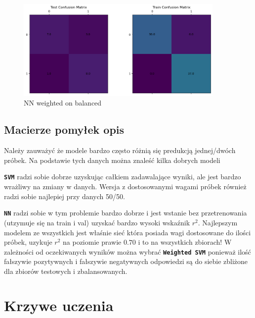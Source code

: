 \documentclass[12pt]{article}
\def\code#1{\texttt{#1}}
\begin{document}

        \begin{figure}[h!]
            \centering
            \includegraphics[width=0.9\textwidth]{resources/conf_nn_weighted_balanced.png}
            \caption{NN weighted on balanced}
            \label{fig:conf_nn_weighted_on_balanced}
        \end{figure}
        
        \newpage
        \subsection{Macierze pomyłek opis}
        Należy zauważyć że modele bardzo często różnią się predukcją jednej/dwóch próbek. Na podstawie tych 
        danych można znaleść kilka dobrych modeli
        
        \textbf{\code{SVM}} radzi sobie dobrze uzyskując całkiem zadawalające wyniki, 
        ale jest bardzo wrażliwy na zmiany w danych. Wersja z dostosowanymi wagami próbek również radzi sobie 
        najlepiej przy danych 50/50.

        \textbf{\code{NN}} radzi sobie w tym problemie bardzo dobrze i jest wstanie bez przetrenowania 
        (utzymuje się na train i val) uzyskać bardzo wysoki wskaźnik $r^2$. Najlepszym modelem ze wszystkich 
        jest właśnie sieć która posiada wagi dostosowane do ilości próbek, uzykuje $r^2$ na poziomie prawie $0.70$ i to na 
        wszystkich zbiorach! W zależności od oczekiwanych wyników można wybrać \textbf{\code{Weighted SVM}} ponieważ ilość 
        fałszywie pozytywnych i fałszywie negatywnych odpowiedzi są do siebie zbliżone dla zbiorów 
        testowych i zbalansowanych.
        
        \newpage
        
        \section{Krzywe uczenia}
\end{document}
